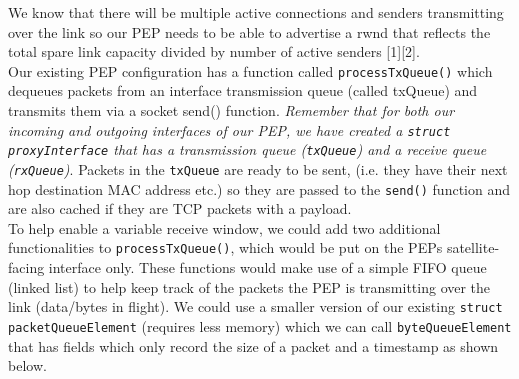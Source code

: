 \documentclass{uathesis}
\begin{document}
We know that there will be multiple active connections and senders transmitting over the link so our PEP needs to be able to advertise a rwnd that reflects the total spare link capacity divided by number of active senders [1][2]. \\

Our existing PEP configuration has a function called {\tt processTxQueue()} which dequeues packets from an interface transmission queue (called txQueue) and transmits them via a socket send() function. \emph{Remember that for both our incoming and outgoing interfaces of our PEP, we have created a {\tt struct proxyInterface} that has a transmission queue ({\tt txQueue}) and a receive queue ({\tt rxQueue})}. Packets in the {\tt txQueue} are ready to be sent, (i.e. they have their next hop destination MAC address etc.) so they are passed to the {\tt send()} function and are also cached if they are TCP packets with a payload. \\ 

To help enable a variable receive window, we could add two additional functionalities to {\tt processTxQueue()}, which would be put on the PEPs satellite-facing interface only. These functions would make use of a simple FIFO queue (linked list) to help keep track of the packets the PEP is transmitting over the link (data/bytes in flight). We could use a smaller version of our existing {\tt struct packetQueueElement} (requires less memory) which we can call {\tt byteQueueElement} that has fields which only record the size of a packet and a timestamp as shown below. \\

 \\

 \\
\end{document}
